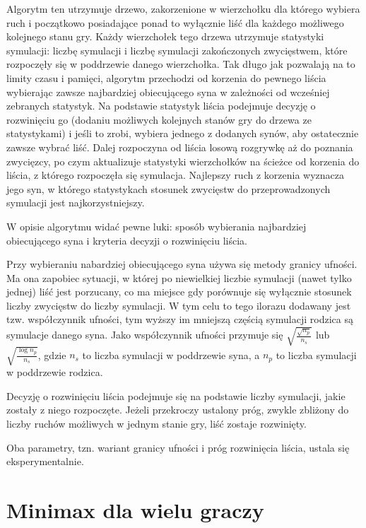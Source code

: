 \documentclass{pracamgr}
\begin{document}
Algorytm ten utrzymuje drzewo, zakorzenione w wierzchołku dla którego wybiera ruch i początkowo posiadające ponad to wyłącznie liść dla każdego możliwego kolejnego stanu gry.
Każdy wierzchołek tego drzewa utrzymuje statystyki symulacji: liczbę symulacji i liczbę symulacji zakończonych zwycięstwem, które rozpoczęły się w poddrzewie danego wierzchołka.
Tak długo jak pozwalają na to limity czasu i pamięci, algorytm przechodzi od korzenia do pewnego liścia wybierając zawsze najbardziej obiecującego syna w zależności od wcześniej zebranych statystyk. Na podstawie statystyk liścia podejmuje decyzję o rozwinięciu go (dodaniu możliwych kolejnych stanów gry do drzewa ze statystykami) i jeśli to zrobi, wybiera jednego z dodanych synów, aby ostatecznie zawsze wybrać liść.
Dalej rozpoczyna od liścia losową rozgrywkę aż do poznania zwycięzcy, po czym aktualizuje statystyki wierzchołków na ścieżce od korzenia do liścia, z którego rozpoczęła się symulacja.
Najlepszy ruch z korzenia wyznacza jego syn, w którego statystykach stosunek zwycięstw do przeprowadzonych symulacji jest najkorzystniejszy.

W opisie algorytmu widać pewne luki: sposób wybierania najbardziej obiecującego syna i kryteria decyzji o rozwinięciu liścia.

Przy wybieraniu nabardziej obiecującego syna używa się metody granicy ufności.
Ma ona zapobiec sytuacji, w której po niewielkiej liczbie symulacji (nawet tylko jednej) liść jest porzucany, co ma miejsce gdy porównuje się wyłącznie stosunek liczby zwycięstw do liczby symulacji.
W tym celu to tego ilorazu dodawany jest tzw. współczynnik ufności, tym wyższy im mniejszą częścią symulacji rodzica są symulacje danego syna. Jako współczynnik ufności przymuje się \(\sqrt{\frac{\sqrt{n_p}}{n_s}}\) lub \(\sqrt{\frac{\log{n_p}}{n_s}}\), gdzie \(n_s\) to liczba symulacji w poddrzewie syna, a \(n_p\) to liczba symulacji w poddrzewie rodzica.

Decyzję o rozwinięciu liścia podejmuje się na podstawie liczby symulacji, jakie zostały z niego rozpoczęte. Jeżeli przekroczy ustalony próg, zwykle zbliżony do liczby ruchów możliwych w jednym stanie gry, liść zostaje rozwinięty.

Oba parametry, tzn. wariant granicy ufności i próg rozwinięcia liścia, ustala się eksperymentalnie.

\section{Minimax dla wielu graczy}
\end{document}
